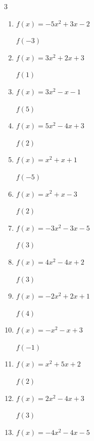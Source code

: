 


\setcounter{quesnum}{45}

\begin{multicols}{3}
\begin{enumerate}
  \itemsep=10pt
  \item $f(x)=-5x^{2}+3x-2$

$f(-3)$
        \phantom{$= -56$}

  \item $f(x)=3x^{2}+2x+3$

$f(1)$
        \phantom{$= 8$}

  \item $f(x)=3x^{2}-x-1$

$f(5)$
        \phantom{$= 69$}

  \item $f(x)=5x^{2}-4x+3$

$f(2)$
        \phantom{$= 15$}

  \item $f(x)=x^{2}+x+1$

$f(-5)$
        \phantom{$= 21$}

  \item $f(x)=x^{2}+x-3$

$f(2)$
        \phantom{$= 3$}

  \item $f(x)=-3x^{2}-3x-5$

$f(3)$
        \phantom{$= -41$}

  \item $f(x)=4x^{2}-4x+2$

$f(3)$
        \phantom{$= 26$}

  \item $f(x)=-2x^{2}+2x+1$

$f(4)$
        \phantom{$= -23$}

  \item $f(x)=-x^{2}-x+3$

$f(-1)$
        \phantom{$= 3$}

  \item $f(x)=x^{2}+5x+2$

$f(2)$
        \phantom{$= 16$}

  \item $f(x)=2x^{2}-4x+3$

$f(3)$
        \phantom{$= 9$}

  \item $f(x)=-4x^{2}-4x-5$


\end{enumerate}
\end{multicols}

